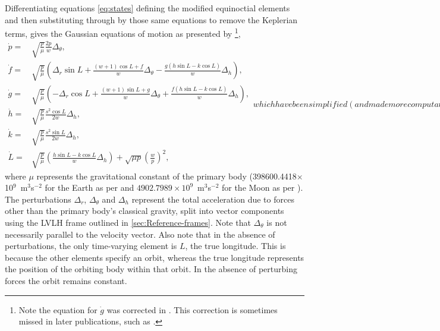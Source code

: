 Differentiating equations \eqref{eq:states} defining the modified equinoctial elements and then substituting through by those same equations to remove the Keplerian terms, gives the Gaussian equations of motion as presented by \textcite{Walker1985,Walker1986,Keppeler_thesis,Erb_thesis,Letterio_thesis,Hintz2008} \footnote{Note the equation for $\dot{g}$ was corrected in \textcite{Walker1986}. This correction is sometimes missed in later publications, such as \textcite{Hintz2008}.},
\begin{subequations}\label{eq:state-updates}
\begin{eqnarray}
\dot{p} = & \sqrt{\frac{p}{\mu}}\frac{2p}{w}\Delta_\theta \label{eq:pdot},\\
\dot{f} = & \sqrt{\frac{p}{\mu}}\left(\Delta_r\sin L+\frac{\left(w+1\right)\cos L+f}{w}\Delta_\theta-\frac{g\left(h\sin L-k\cos L\right)}{w}\Delta_h \right) \label{eq:fdot},\\
\dot{g} = & \sqrt{\frac{p}{\mu}}\left(-\Delta_r\cos L+\frac{\left(w+1\right)\sin L+g}{w}\Delta_\theta+\frac{f\left(h\sin L-k\cos L\right)}{w}\Delta_h \right) \label{eq:gdot},\\
\dot{h} = & \sqrt{\frac{p}{\mu}}\frac{s^{2}\cos L}{2w}\Delta_h \label{eq:hdot},\\
\dot{k} = & \sqrt{\frac{p}{\mu}}\frac{s^{2}\sin L}{2w}\Delta_h \label{eq:kdot},\\
\dot{L} = & \sqrt{\frac{p}{\mu}}\left(\frac{h\sin L-k\cos L}{w}\Delta_h \right)+\sqrt{\mu p}\left(\frac{w}{p}\right)^{2} \label{eq:Ldot},
\end{eqnarray}
which have been simplified (and made more computationally efficient) using the terms
\begin{eqnarray}
w & = & 1+f\cos L+g\sin L\label{eq:w_helper},\\
s^{2} & = & 1+h^{2}+k^{2}\label{eq:s2_helper},
\end{eqnarray}
\end{subequations}
where $\mu$ represents the gravitational constant of the primary body \linebreak (398600.4418$\times$10$^9$~m$^3$s$^{-2}$ for the Earth as per \cite{WGS84} and  $4902.7989\times10^9$~m$^3$s$^{-2}$ for the Moon as per \cite{Zhang1994}). The perturbations $\Delta_r$, $\Delta_\theta$ and $\Delta_h$ represent the total acceleration due to forces other than the primary body's classical gravity, split into vector components using the LVLH frame outlined in \autoref{sec:Reference-frames}. Note that $\Delta_\theta$ is not necessarily parallel to the velocity vector. Also note that in the absence of perturbations, the only time-varying element is $L$, the true longitude. This is because the other elements specify an orbit, whereas the true longitude represents the position of the orbiting body within that orbit. In the absence of perturbing forces the orbit remains constant.




